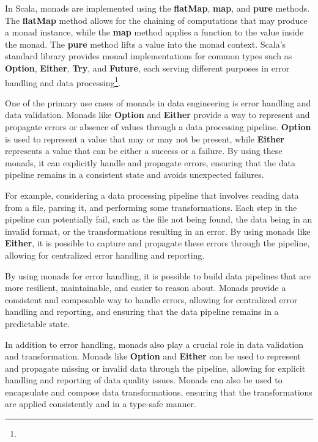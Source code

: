 In Scala, monads are implemented using the \textbf{flatMap}, \textbf{map}, and \textbf{pure} methods. The \textbf{flatMap} method allows for the chaining of computations that may produce a monad instance, while the \textbf{map} method applies a function to the value inside the monad. The \textbf{pure} method lifts a value into the monad context. Scala's standard library provides monad implementations for common types such as \textbf{Option}, \textbf{Either}, \textbf{Try}, and \textbf{Future}, each serving different purposes in error handling and data processing\footnote[4]{}.

One of the primary use cases of monads in data engineering is error handling and data validation. Monads like \textbf{Option} and \textbf{Either} provide a way to represent and propagate errors or absence of values through a data processing pipeline. \textbf{Option} is used to represent a value that may or may not be present, while \textbf{Either} represents a value that can be either a success or a failure. By using these monads,  it can explicitly handle and propagate errors, ensuring that the data pipeline remains in a consistent state and avoids unexpected failures\footnotemark[4].

For example, considering a data processing pipeline that involves reading data from a file, parsing it, and performing some transformations. Each step in the pipeline can potentially fail, such as the file not being found, the data being in an invalid format, or the transformations resulting in an error. By using monads like \textbf{Either}, it is possible to capture and propagate these errors through the pipeline, allowing for centralized error handling and reporting\footnotemark[4].



By using monads for error handling, it is possible to build data pipelines that are more resilient, maintainable, and easier to reason about. Monads provide a consistent and composable way to handle errors, allowing for centralized error handling and reporting, and ensuring that the data pipeline remains in a predictable state\footnotemark[4].

In addition to error handling, monads also play a crucial role in data validation and transformation. Monads like \textbf{Option} and \textbf{Either} can be used to represent and propagate missing or invalid data through the pipeline, allowing for explicit handling and reporting of data quality issues. Monads can also be used to encapsulate and compose data transformations, ensuring that the transformations are applied consistently and in a type-safe manner\footnotemark[4].

